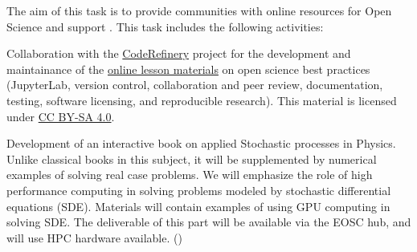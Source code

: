 \begin{task}[
  title=Online resources for open science,
  id=online-resources,
  lead=INSERM,
  PM=14,
  wphases={0-48},
  partners={CDS,EP,QS,SIL,SRL,UPSUD,WTT,XFEL}
]
  The aim of this task is to provide communities with online resources for Open Science and support .
  This task includes the following activities:
  \begin{compactitem}
  \item Collaboration with the \href{https://coderefinery.org}{CodeRefinery} project for the development and maintainance of the \href{https://coderefinery.org/lessons/}{online lesson materials} on open science best practices (JupyterLab, version control, collaboration and peer review, documentation, testing, software licensing, and reproducible research).
  This material is licensed under \href{https://creativecommons.org/licenses/by-sa/4.0/}{CC BY-SA 4.0}.
  \item Development of an interactive book on applied Stochastic processes in Physics. Unlike classical books in this subject, it will be supplemented by numerical examples of solving real case problems. We will emphasize the
role of high performance computing in solving problems modeled by stochastic differential equations (SDE). Materials will contain examples of using GPU computing in solving SDE. The deliverable of this part will be available via the EOSC hub, and will use HPC hardware available. ()
  \end{compactitem}
\end{task}
